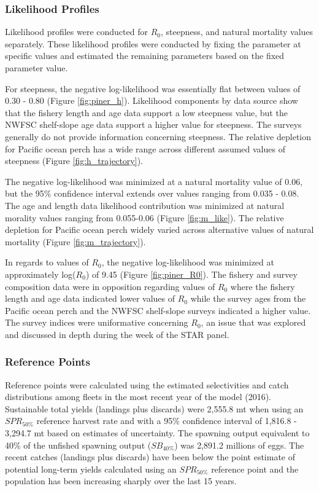 \documentclass[12pt,]{article}
\begin{document}
\subsubsection{Likelihood Profiles}\label{likelihood-profiles}

Likelihood profiles were conducted for \(R_0\), steepness, and natural
mortality values separately. These likelihood profiles were conducted by
fixing the parameter at specific values and estimated the remaining
parameters based on the fixed parameter value.

For steepness, the negative log-likelihood was essentially flat between
values of 0.30 - 0.80 (Figure \ref{fig:piner_h}). Likelihood components
by data source show that the fishery length and age data support a low
steepness value, but the NWFSC shelf-slope age data support a higher
value for steepness. The surveys generally do not provide information
concerning steepness. The relative depletion for Pacific ocean perch has
a wide range across different assumed values of steepness (Figure
\ref{fig:h_trajectory}).

The negative log-likelihood was minimized at a natural mortality value
of 0.06, but the 95\% confidence interval extends over values ranging
from 0.035 - 0.08. The age and length data likelihood contribution was
minimized at natural morality values ranging from 0.055-0.06 (Figure
\ref{fig:m_like}). The relative depletion for Pacific ocean perch widely
varied across alternative values of natural mortality (Figure
\ref{fig:m_trajectory}).

In regards to values of \(R_0\), the negative log-likelihood was
minimized at approximately log(\(R_0\)) of 9.45 (Figure
\ref{fig:piner_R0}). The fishery and survey composition data were in
opposition regarding values of \(R_0\) where the fishery length and age
data indicated lower values of \(R_0\) while the survey ages from the
Pacific ocean perch and the NWFSC shelf-slope surveys indicated a higher
value. The survey indices were uniformative concerning \(R_0\), an issue
that was explored and discussed in depth during the week of the STAR
panel.

\subsubsection{Reference Points}\label{reference-points-1}

Reference points were calculated using the estimated selectivities and
catch distributions among fleets in the most recent year of the model
(2016). Sustainable total yields (landings plus discards) were 2,555.8
mt when using an \(SPR_{50\%}\) reference harvest rate and with a 95\%
confidence interval of 1,816.8 - 3,294.7 mt based on estimates of
uncertainty. The spawning output equivalent to 40\% of the unfished
spawning output (\(SB_{40\%}\)) was 2,891.2 millions of eggs. The recent
catches (landings plus discards) have been below the point estimate of
potential long-term yields calculated using an \(SPR_{50\%}\) reference
point and the population has been increasing sharply over the last 15
years.
\end{document}
